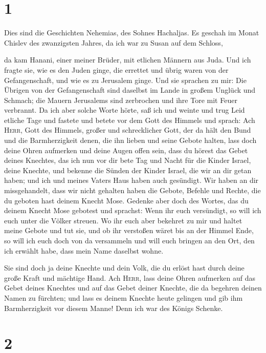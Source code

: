 \hypertarget{section}{%
\section{1}\label{section}}

 Dies sind die Geschichten Nehemias, des Sohnes Hachaljas.
Es geschah im Monat Chislev des zwanzigsten Jahres, da ich war zu Susan
auf dem Schloss,

 da kam Hanani, einer meiner Brüder, mit etlichen Männern
aus Juda. Und ich fragte sie, wie es den Juden ginge, die errettet und
übrig waren von der Gefangenschaft, und wie es zu Jerusalem ginge.
 Und sie sprachen zu mir: Die Übrigen von der
Gefangenschaft sind daselbst im Lande in großem Unglück und Schmach; die
Mauern Jerusalems sind zerbrochen und ihre Tore mit Feuer verbrannt.
 Da ich aber solche Worte hörte, saß ich und weinte und
trug Leid etliche Tage und fastete und betete vor dem Gott des Himmels
 und sprach: Ach \textsc{Herr}, Gott des Himmels, großer
und schrecklicher Gott, der da hält den Bund und die Barmherzigkeit
denen, die ihn lieben und seine Gebote halten,  lass doch
deine Ohren aufmerken und deine Augen offen sein, dass du hörest das
Gebet deines Knechtes, das ich nun vor dir bete Tag und Nacht für die
Kinder Israel, deine Knechte, und bekenne die Sünden der Kinder Israel,
die wir an dir getan haben; und ich und meines Vaters Haus haben auch
gesündigt.  Wir haben an dir missgehandelt, dass wir nicht
gehalten haben die Gebote, Befehle und Rechte, die du geboten hast
deinem Knecht Mose.  Gedenke aber doch des Wortes, das du
deinem Knecht Mose gebotest und sprachst: Wenn ihr euch versündigt, so
will ich euch unter die Völker streuen.  Wo ihr euch aber
bekehret zu mir und haltet meine Gebote und tut sie, und ob ihr
verstoßen wäret bis an der Himmel Ende, so will ich euch doch von da
versammeln und will euch bringen an den Ort, den ich erwählt habe, dass
mein Name daselbst wohne.

 Sie sind doch ja deine Knechte und dein Volk, die du
erlöst hast durch deine große Kraft und mächtige Hand. 
Ach \textsc{Herr}, lass deine Ohren aufmerken auf das Gebet deines
Knechtes und auf das Gebet deiner Knechte, die da begehren deinen Namen
zu fürchten; und lass es deinem Knechte heute gelingen und gib ihm
Barmherzigkeit vor diesem Manne! Denn ich war des Königs Schenke.

\hypertarget{section-1}{%
\section{2}\label{section-1}}

